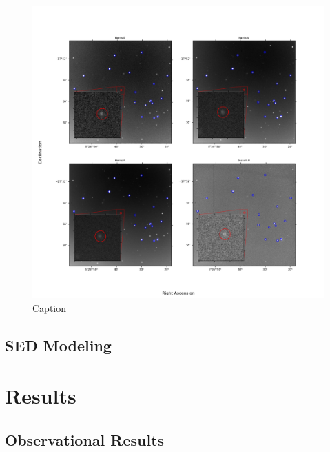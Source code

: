 \documentclass{aastex631}
\begin{document}
\begin{figure}
  \includegraphics[width=\textwidth]{../analysis/fcal-images.png}
  \caption{Caption}
  \label{fig:targ}
\end{figure}

\subsection{SED Modeling}

\section{Results}
\subsection{Observational Results}
\end{document}
